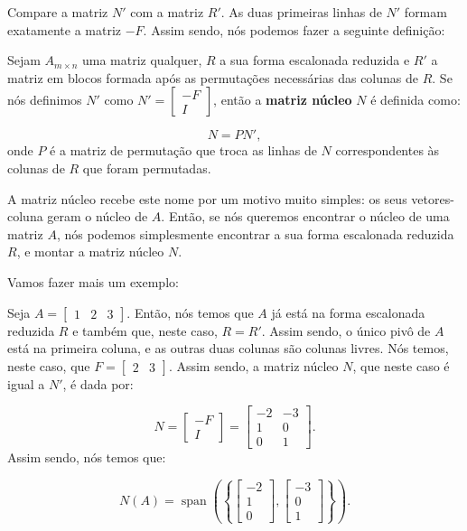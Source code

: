 Compare a matriz $N'$ com a matriz $R'$. As duas primeiras linhas de $N'$ formam exatamente a matriz $-F$. Assim sendo, nós podemos fazer a seguinte definição:

\begin{Definition}
	Sejam $A_{m\times n}$ uma matriz qualquer, $R$ a sua forma escalonada reduzida e $R'$ a matriz em blocos formada após as permutações necessárias das colunas de $R$. Se nós definimos $N'$ como $N' = \begin{bmatrix}
		-F \\
		I
	\end{bmatrix}$, então a \textbf{matriz núcleo} $N$ é definida como:
	
	$$
	N = PN',
	$$
	onde $P$ é a matriz de permutação que troca as linhas de $N$ correspondentes às colunas de $R$ que foram permutadas.
\end{Definition}

A matriz núcleo recebe este nome por um motivo muito simples: os seus vetores-coluna geram o núcleo de $A$. Então, se nós queremos encontrar o núcleo de uma matriz $A$, nós podemos simplesmente encontrar a sua forma escalonada reduzida $R$, e montar a matriz núcleo $N$.

Vamos fazer mais um exemplo:

\begin{Example}
	Seja $A = \begin{bmatrix}
		1 & 2 & 3
	\end{bmatrix}$. Então, nós temos que $A$ já está na forma escalonada reduzida $R$ e também que, neste caso, $R = R'$. Assim sendo, o único pivô de $A$ está na primeira coluna, e as outras duas colunas são colunas livres. Nós temos, neste caso, que $F = \begin{bmatrix}
		2 & 3
	\end{bmatrix}$. Assim sendo, a matriz núcleo $N$, que neste caso é igual a $N'$, é dada por:
	
	$$
	N = \begin{bmatrix}
		-F \\
		I
	\end{bmatrix} = \begin{bmatrix}
		-2 & -3 \\
		1 & 0 \\
		0 & 1
	\end{bmatrix}.
	$$
	Assim sendo, nós temos que:
	
	$$
	N(A) = \operatorname{span}\left(\left\{\begin{bmatrix}
		-2 \\
		1 \\
		0
	\end{bmatrix}, \begin{bmatrix}
		-3 \\
		0 \\
		1
	\end{bmatrix}\right\}\right).
	$$
\end{Example}

